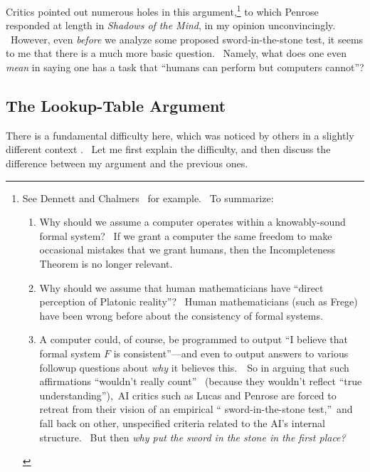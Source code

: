 \documentclass[11pt,onecolumn]{article}%
\begin{document}
Critics pointed out numerous holes in this argument,\footnote{See Dennett
\cite{dennett} and Chalmers \cite{chalmers}\ for example. \ To summarize:
\par
\begin{enumerate}
\item[(1)] Why should we assume a computer operates within a knowably-sound
formal system? \ If we grant a computer the same freedom to make occasional
mistakes that we grant humans, then the Incompleteness Theorem is no longer
relevant.
\par
\item[(2)] Why should we assume that human mathematicians have
\textquotedblleft direct perception of Platonic reality\textquotedblright?
\ Human mathematicians (such as Frege) have been wrong before about the
consistency of formal systems.
\par
\item[(3)] A computer could, of course, be programmed to output
\textquotedblleft I believe that formal system $F$ is
consistent\textquotedblright---and even to output answers to various followup
questions about \textit{why} it believes this.\ \ So in arguing that such
affirmations \textquotedblleft wouldn't really count\textquotedblright%
\ (because they wouldn't reflect \textquotedblleft true
understanding\textquotedblright),\ AI critics such as Lucas and Penrose are
forced to retreat from their vision of an empirical \textquotedblleft
sword-in-the-stone test,\textquotedblright\ and fall back on other,
unspecified criteria related to the AI's internal structure. \ But then
\textit{why put the sword in the stone in the first place?}
\end{enumerate}
} to which Penrose responded at length in \textit{Shadows of the Mind}, in my
opinion unconvincingly. \ However, even \textit{before} we analyze some
proposed sword-in-the-stone test, it seems to me that there is a much more
basic question. \ Namely, what does one even \textit{mean} in saying one has a
task that \textquotedblleft humans can perform but computers
cannot\textquotedblright?

\subsection{The Lookup-Table Argument\label{LOOKUP}}

There is a fundamental difficulty here, which was noticed by others in a
slightly different context \cite{block,parberry,levesque,shieber}. \ Let me
first explain the difficulty, and then discuss the difference between my
argument and the previous ones.
\end{document}
